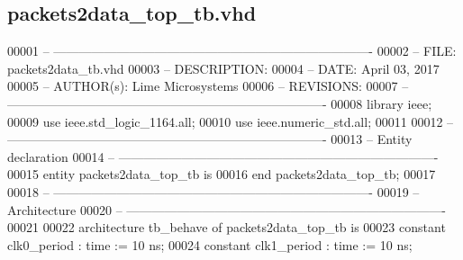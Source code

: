 \subsection{packets2data\+\_\+top\+\_\+tb.\+vhd}
\label{packets2data__top__tb_8vhd_source}

\begin{DoxyCode}
00001 \textcolor{keyword}{-- ---------------------------------------------------------------------------- }
00002 \textcolor{keyword}{-- FILE:    packets2data\_tb.vhd}
00003 \textcolor{keyword}{-- DESCRIPTION: }
00004 \textcolor{keyword}{-- DATE:    April 03, 2017}
00005 \textcolor{keyword}{-- AUTHOR(s):   Lime Microsystems}
00006 \textcolor{keyword}{-- REVISIONS:}
00007 \textcolor{keyword}{-- ---------------------------------------------------------------------------- }
00008 \textcolor{vhdlkeyword}{library }\textcolor{keywordflow}{ieee};
00009 \textcolor{vhdlkeyword}{use }ieee.std\_logic\_1164.\textcolor{keywordflow}{all};
00010 \textcolor{vhdlkeyword}{use }ieee.numeric\_std.\textcolor{keywordflow}{all};
00011 
00012 \textcolor{keyword}{-- ----------------------------------------------------------------------------}
00013 \textcolor{keyword}{-- Entity declaration}
00014 \textcolor{keyword}{-- ----------------------------------------------------------------------------}
00015 \textcolor{keywordflow}{entity }packets2data_top_tb \textcolor{keywordflow}{is}
00016 \textcolor{keywordflow}{end} \textcolor{vhdlchar}{packets2data\_top\_tb};
00017 
00018 \textcolor{keyword}{-- ----------------------------------------------------------------------------}
00019 \textcolor{keyword}{-- Architecture}
00020 \textcolor{keyword}{-- ----------------------------------------------------------------------------}
00021 
00022 \textcolor{keywordflow}{architecture} tb\_behave \textcolor{keywordflow}{of} packets2data_top_tb is
00023 \textcolor{keywordflow}{constant} \textcolor{vhdlchar}{clk0_period}    \textcolor{vhdlchar}{:} \textcolor{comment}{time} \textcolor{vhdlchar}{:=} \textcolor{vhdllogic}{}\textcolor{vhdllogic}{10} \textcolor{vhdlchar}{ns};
00024 \textcolor{keywordflow}{constant} \textcolor{vhdlchar}{clk1_period}    \textcolor{vhdlchar}{:} \textcolor{comment}{time} \textcolor{vhdlchar}{:=} \textcolor{vhdllogic}{}\textcolor{vhdllogic}{10} \textcolor{vhdlchar}{ns}; 

\end{DoxyCode}
